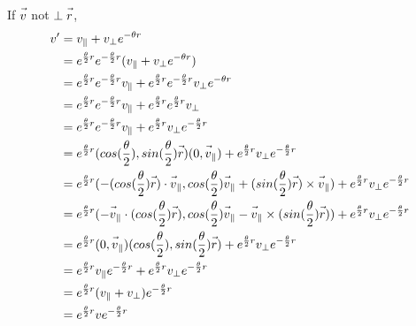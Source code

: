\documentclass{article}
\newcommand{\fvec}[1]{\vec{\vphantom{A}#1}}
\begin{document}
If $ \fvec{v} $ not $ \perp \fvec{r} $,
\begin{equation}
\begin{split}
    v' & = v_{\parallel} + v_{\perp}e^{-\theta r} \\
       & = e^{\frac{\theta}{2}r}e^{-\frac{\theta}{2} r}(v_{\parallel} + v_{\perp}e^{-\theta r}) \\
       & = e^{\frac{\theta}{2}r}e^{-\frac{\theta}{2} r}v_{\parallel} + e^{\frac{\theta}{2}r}e^{-\frac{\theta}{2} r}v_{\perp}e^{-\theta r} \\
       & = e^{\frac{\theta}{2}r}e^{-\frac{\theta}{2} r}v_{\parallel} + e^{\frac{\theta}{2}r}e^{\frac{\theta}{2} r}v_{\perp} \\
       & = e^{\frac{\theta}{2}r}e^{-\frac{\theta}{2} r}v_{\parallel} + e^{\frac{\theta}{2}r}v_{\perp}e^{-\frac{\theta}{2} r} \\
       & = e^{\frac{\theta}{2}r}(cos(\frac{\theta}{2}), sin(\frac{\theta}{2})\fvec{r})(0,\fvec{v}_{\parallel}) + e^{\frac{\theta}{2}r}v_{\perp}e^{-\frac{\theta}{2} r} \\
       & = e^{\frac{\theta}{2}r}(-(cos(\frac{\theta}{2})\fvec{r}) \cdot \fvec{v}_{\parallel},cos(\frac{\theta}{2})\fvec{v}_{\parallel} + (sin(\frac{\theta}{2})\fvec{r}) \times \fvec{v}_{\parallel}) + e^{\frac{\theta}{2}r}v_{\perp}e^{-\frac{\theta}{2} r} \\
       & = e^{\frac{\theta}{2}r}(-\fvec{v}_{\parallel} \cdot (cos(\frac{\theta}{2})\fvec{r}), cos(\frac{\theta}{2})\fvec{v}_{\parallel} - \fvec{v}_{\parallel} \times (sin(\frac{\theta}{2})\fvec{r})) + e^{\frac{\theta}{2}r}v_{\perp}e^{-\frac{\theta}{2} r} \\
       & = e^{\frac{\theta}{2}r}(0,\fvec{v}_{\parallel})(cos(\frac{\theta}{2}), sin(\frac{\theta}{2})\fvec{r}) + e^{\frac{\theta}{2}r}v_{\perp}e^{-\frac{\theta}{2} r} \\
       & = e^{\frac{\theta}{2}r}v_{\parallel}e^{-\frac{\theta}{2} r} + e^{\frac{\theta}{2}r}v_{\perp}e^{-\frac{\theta}{2} r} \\
       & = e^{\frac{\theta}{2}r}(v_{\parallel} + v_{\perp})e^{-\frac{\theta}{2} r} \\
       & = e^{\frac{\theta}{2}r}ve^{-\frac{\theta}{2} r} \\
\end{split}
\end{equation}
\end{document}
